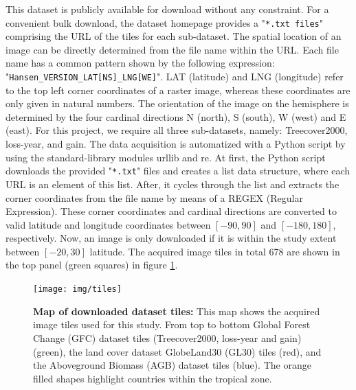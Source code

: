 		This dataset is publicly available for download without any constraint. For a convenient bulk download, the dataset homepage provides a "\verb|*.txt files|" comprising the \ac{URL} of the tiles for each sub-dataset. The spatial location of an image can be directly determined from the file name within the \ac{URL}. Each file name has a common pattern shown by the following expression: "\verb|Hansen_VERSION_LAT[NS]_LNG[WE]|". LAT (latitude) and LNG (longitude) refer to the top left corner coordinates of a raster image, whereas these coordinates are only given in natural numbers. The orientation of the image on the hemisphere is determined by the four cardinal directions N (north), S (south), W (west) and E (east). For this project, we require all three sub-datasets, namely: Treecover2000, loss-year, and gain. The data acquisition is automatized with a Python script by using the standard-library modules urllib and re. At first, the Python script downloads the provided "\verb|*.txt|" files and creates a list data structure, where each \ac{URL} is an element of this list. After, it cycles through the list and extracts the corner coordinates from the file name by means of a REGEX (Regular Expression). These corner coordinates and cardinal directions are converted to valid latitude and longitude coordinates between $[-90, 90]$ and $[-180, 180]$, respectively. Now, an image is only downloaded if it is within the study extent between $[-20, 30]$ latitude. The acquired image tiles in total 678 are shown in the top panel (green squares) in figure \ref{fig:dataset_tiles}.
		\begin{figure}[ht]
			\centering
			\texttt{[image: img/tiles]}
			\caption[Map of dataset tiles]{\textbf{Map of downloaded dataset tiles:} This map shows the acquired image tiles used for this study. From top to bottom Global Forest Change (GFC) dataset tiles (Treecover2000, loss-year and gain) (green), the land cover dataset GlobeLand30 (GL30) tiles (red), and the Aboveground Biomass (AGB) dataset tiles (blue). The orange filled shapes highlight countries within the tropical zone.}
			\label{fig:dataset_tiles}
		\end{figure}

